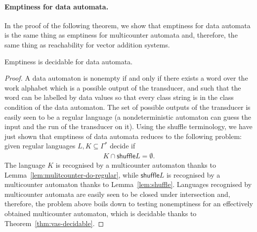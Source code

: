 \paragraph*{Emptiness for data automata.} In the proof of the following theorem, we show that emptiness for data automata is the same thing as emptiness for multicounter automata and, therefore, the same thing as reachability for vector addition systems.
\begin{theorem}\label{thm:data-emptiness}
	Emptiness is decidable for data automata.
\end{theorem}
\begin{proof}
	A data automaton is nonempty if and only if there exists a word over the work alphabet which is a possible output of the transducer, and such that the word can be labelled by data values so that every class string is in the class condition of the data automaton. The set of possible outputs of the transducer is easily seen to be a regular language (a nondeterministic automaton can guess the input and the run of the transducer on it). Using the shuffle terminology, we have just shown that emptiness of data automata reduces to the following problem: given regular languages $L,K \subseteq \Gamma^*$ decide if
\begin{align*}
	K \cap \mathsf{shuffle}L = \emptyset.
\end{align*}
The language $K$ is recognised by a multicounter automaton thanks to Lemma~\ref{lem:mulitcounter-do-regular}, while $\mathsf{shuffle}L$ is recognised by a multicounter automaton thanks to Lemma~\ref{lem:shuffle}. Languages recognised by multicounter automata are easily seen to be closed under intersection and, therefore, the problem above boils down to testing nonemptiness for an effectively obtained multicounter automaton, which is decidable thanks to Theorem~\ref{thm:vas-decidable}.\end{proof}

\pagebreak
\exercisepart
{}
{
	
}


